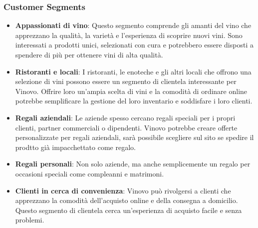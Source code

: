\documentclass[12pt, a4paper]{article}
\begin{document}
\subsubsection{Customer Segments}
\begin{itemize}
    \item \textbf{Appassionati di vino}: Questo segmento comprende gli amanti del vino che apprezzano la qualità, la varietà e l'esperienza di scoprire nuovi vini. Sono interessati a prodotti unici, selezionati con cura e potrebbero essere disposti a spendere di più per ottenere vini di alta qualità.
    \item \textbf{Ristoranti e locali}: I ristoranti, le enoteche e gli altri locali che offrono una selezione di vini possono essere un segmento di clientela interessante per Vinovo. Offrire loro un'ampia scelta di vini e la comodità di ordinare online potrebbe semplificare la gestione del loro inventario e soddisfare i loro clienti.
    \item \textbf{Regali aziendali}: Le aziende spesso cercano regali speciali per i propri clienti, partner commerciali o dipendenti. Vinovo potrebbe creare offerte personalizzate per regali aziendali, sarà possibile scegliere sul sito se spedire il prodtto già impacchettato come regalo.
    \item \textbf{Regali personali}: Non solo aziende, ma anche semplicemente un regalo per occasioni speciali come compleanni e matrimoni.
    \item \textbf{Clienti in cerca di convenienza}: Vinovo può rivolgersi a clienti che apprezzano la comodità dell'acquisto online e della consegna a domicilio. Questo segmento di clientela cerca un'esperienza di acquisto facile e senza problemi.
\end{itemize}
\end{document}
